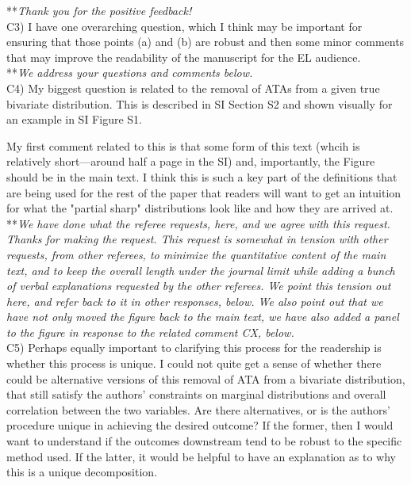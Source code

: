 \documentclass[letterpaper,11pt]{article}
\begin{document}
\noindent ***\emph{Thank you for the positive feedback!} \\

\noindent C3) I have one overarching question, which I think may be important for ensuring that those points (a) and (b) are robust and then some minor comments that may improve the readability of the manuscript for the EL audience. \\

\noindent ***\emph{We address your questions and comments below.} \\

\noindent C4) My biggest question is related to the removal of ATAs from a given true bivariate distribution.  This is described in SI Section S2 and shown visually for an example in SI Figure S1. 

My first comment related to this is that some form of this text (whcih is relatively short---around half a page in the SI) and, importantly, the Figure should be in the main text.  I think this is such a key part of the definitions that are being used for the rest of the paper that readers will want to get an intuition for what the "partial sharp" distributions look like and how they are arrived at. \\

\noindent ***\emph{We have done what the referee requests, here, and we agree with this request. Thanks for
making the request. This request is somewhat in tension with other requests, from other referees, 
to minimize the quantitative 
content of the main text, and to keep the overall length under the journal limit while adding a bunch of
verbal explanations requested by the other referees. We point this tension out here, and refer back to it in
other responses, below. We also point out that we have not only moved the figure back to the main text,
we have also added a panel to the figure in response to the related comment CX, below.} \\

\noindent C5) Perhaps equally important to clarifying this process for the readership is whether this process is unique. I could not quite get a sense of whether there could be alternative versions of this removal of ATA from a bivariate distribution, that still satisfy the authors' constraints on marginal distributions and overall correlation between the two variables. Are there alternatives, or is the authors' procedure unique in achieving the desired outcome?  If the former, then I would want to understand if the outcomes downstream tend to be robust to the specific method used. If the latter, it would be helpful to have an explanation as to why this is a unique decomposition. \\
\end{document}
